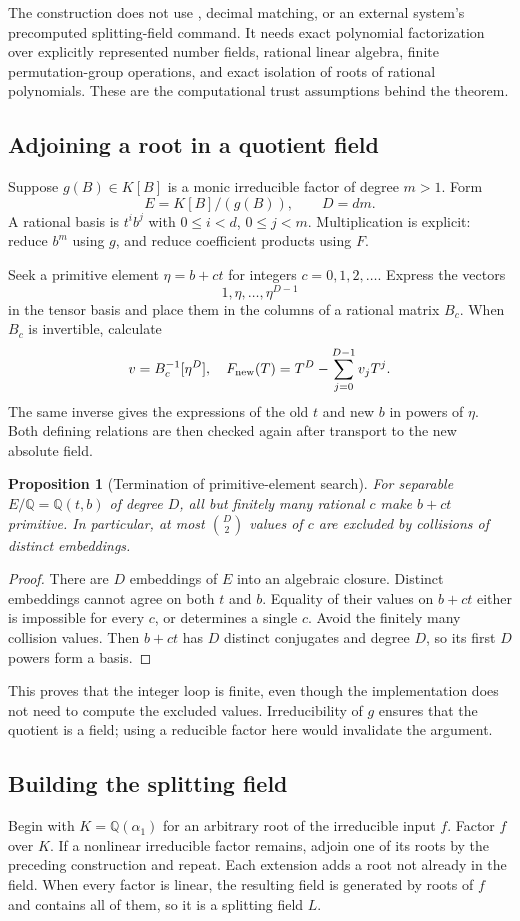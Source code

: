 \documentclass[11pt,letterpaper]{article}
\newtheorem{proposition}[theorem]{Proposition}
\theoremstyle{definition}\newtheorem{definition}[theorem]{Definition}
\theoremstyle{remark}\newtheorem{remark}[theorem]{Remark}
\newcommand{\Q}{\mathbb Q}\newcommand{\C}{\mathbb C}\newcommand{\Z}{\mathbb Z}
\newcommand{\code}[1]{\texttt{\detokenize{#1}}}
\begin{document}
The construction does not use \code{RootApproximant}, decimal matching, or an external system's precomputed splitting-field command. It needs exact polynomial factorization over explicitly represented number fields, rational linear algebra, finite permutation-group operations, and exact isolation of roots of rational polynomials. These are the computational trust assumptions behind the theorem.

\subsection{Adjoining a root in a quotient field}
Suppose $g(B)\in K[B]$ is a monic irreducible factor of degree $m>1$. Form
\[
 E=K[B]/(g(B)),\qquad D=dm.
\]
A rational basis is $t^i b^j$ with $0\leq i<d$, $0\leq j<m$. Multiplication is explicit: reduce $b^m$ using $g$, and reduce coefficient products using $F$.

Seek a primitive element $\eta=b+ct$ for integers $c=0,1,2,\ldots$. Express the vectors
\[
 1,\eta,\ldots,\eta^{D-1}
\]
in the tensor basis and place them in the columns of a rational matrix $B_c$. When $B_c$ is invertible, calculate
\[
 v=B_c^{-1}[\eta^D],\quad
 F_{\rm new}(T)=T^D-\sum_{j=0}^{D-1}v_j T^j.
\]
The same inverse gives the expressions of the old $t$ and new $b$ in powers of $\eta$. Both defining relations are then checked again after transport to the new absolute field.

\begin{proposition}[Termination of primitive-element search]
For separable $E/\Q=\Q(t,b)$ of degree $D$, all but finitely many rational $c$ make $b+ct$ primitive. In particular, at most $\binom D2$ values of $c$ are excluded by collisions of distinct embeddings.
\end{proposition}
\begin{proof}
There are $D$ embeddings of $E$ into an algebraic closure. Distinct embeddings cannot agree on both $t$ and $b$. Equality of their values on $b+ct$ either is impossible for every $c$, or determines a single $c$. Avoid the finitely many collision values. Then $b+ct$ has $D$ distinct conjugates and degree $D$, so its first $D$ powers form a basis.
\end{proof}
This proves that the integer loop is finite, even though the implementation does not need to compute the excluded values. Irreducibility of $g$ ensures that the quotient is a field; using a reducible factor here would invalidate the argument.

\subsection{Building the splitting field}
Begin with $K=\Q(\alpha_1)$ for an arbitrary root of the irreducible input $f$. Factor $f$ over $K$. If a nonlinear irreducible factor remains, adjoin one of its roots by the preceding construction and repeat. Each extension adds a root not already in the field. When every factor is linear, the resulting field is generated by roots of $f$ and contains all of them, so it is a splitting field $L$.
\end{document}
